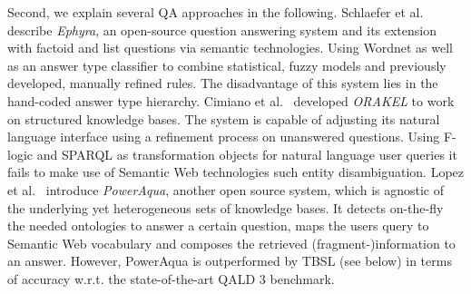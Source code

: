 Second, we explain several QA approaches in the following.
{Schlaefer et al.~\cite{ephyra2007}} describe \emph{Ephyra}, an open-source question answering system and its extension with factoid and list questions via semantic technologies.
Using Wordnet as well as an answer type classifier to combine statistical, fuzzy models and previously developed, manually refined rules. The disadvantage of this system lies in the hand-coded answer type hierarchy. %
Cimiano et al.~\cite{orakel} developed \emph{ORAKEL} to work on structured knowledge bases.
The system is capable of adjusting its natural language interface using a refinement process on unanswered questions. 
Using F-logic and SPARQL as transformation objects for natural language user queries it fails to make use of Semantic Web technologies such entity disambiguation.
{Lopez et al.~\cite{PowerAqua}} introduce \emph{PowerAqua}, another open source system, which is agnostic of the underlying yet heterogeneous sets of knowledge bases. 
It detects on-the-fly the needed ontologies to answer a certain question, maps the users query to Semantic Web vocabulary and composes the retrieved (fragment-)information to an answer. However, PowerAqua is outperformed by TBSL (see below) in terms of accuracy w.r.t. the state-of-the-art QALD 3 benchmark.
